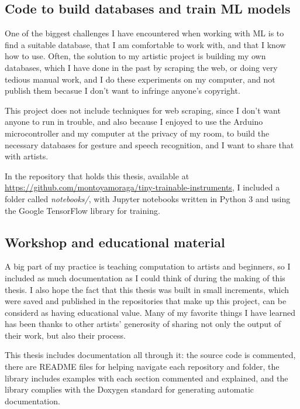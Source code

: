 \subsection{Code to build databases and train ML models}

One of the biggest challenges I have encountered when working with \acrshort{ML} is to find a suitable database, that I am comfortable to work with, and that I know how to use. Often, the solution to my artistic project is building my own databases, which I have done in the past by scraping the web, or doing very tedious manual work, and I do these experiments on my computer, and not publish them becasue I don't want to infringe anyone's copyright.

This project does not include techniques for web scraping, since I don't want anyone to run in trouble, and also because I enjoyed to use the Arduino microcontroller and my computer at the privacy of my room, to build the necessary databases for gesture and speech recognition, and I want to share that with artists.

In the repository that holds this thesis, available at \url{https://github.com/montoyamoraga/tiny-trainable-instruments}, I included a folder called \emph{notebooks/}, with Jupyter notebooks written in Python 3 and using the Google TensorFlow library for training.



\subsection{Workshop and educational material}

A big part of my practice is teaching computation to artists and beginners, so I included as much documentation as I could think of during the making of this thesis. I also hope the fact that this thesis was built in small increments, which were saved and published in the repositories that make up this project, can be considerd as having  educational value. Many of my favorite things I have learned has been thanks to other artists' generosity of sharing not only the output of their work, but also their process.

This thesis includes documentation all through it: the source code is commented, there are README files for helping navigate each repository and folder, the library includes examples with each section commented and explained, and the library complies with the Doxygen standard for generating automatic documentation.

